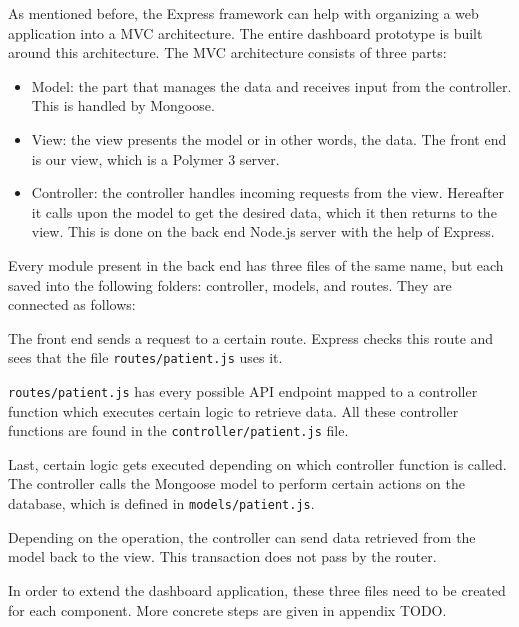         As mentioned before, the Express framework can help with organizing a web application into a MVC architecture. The entire dashboard prototype is built around this architecture. The MVC architecture consists of three parts:
        \begin{itemize}
            \item Model: the part that manages the data and receives input from the controller. This is handled by Mongoose.
            \item View: the view presents the model or in other words, the data. The front end is our view, which is a Polymer 3 server.
            \item Controller: the controller handles incoming requests from the view. Hereafter it calls upon the model to get the desired data, which it then returns to the view. This is done on the back end Node.js server with the help of Express.
        \end{itemize}

        \noindent Every module present in the back end has three files of the same name, but each saved into the following folders: controller, models, and routes. They are connected as follows:
        \begin{myenumerate}
            \item The front end sends a request to a certain route. Express checks this route and sees that the file \texttt{routes/patient.js} uses it. 
            \item \texttt{routes/patient.js} has every possible API endpoint mapped to a controller function which executes certain logic to retrieve data. All these controller functions are found in the \texttt{controller/patient.js} file.
            \item Last, certain logic gets executed depending on which controller function is called. The controller calls the Mongoose model to perform certain actions on the database, which is defined in \texttt{models/patient.js}.
            \item Depending on the operation, the controller can send data retrieved from the model back to the view. This transaction does not pass by the router.
        \end{myenumerate}

        \noindent In order to extend the dashboard application, these three files need to be created for each component. More concrete steps are given in appendix TODO.

